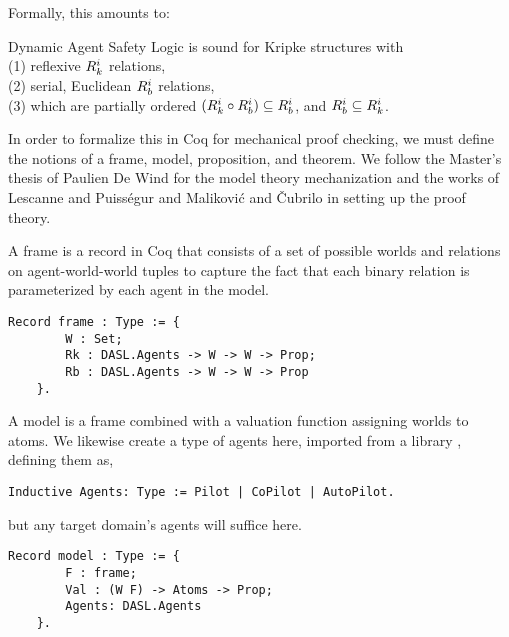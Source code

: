 Formally, this amounts to:

\begin{theorem}[Soundness]
	Dynamic Agent Safety Logic is sound for Kripke structures with\\ (1) reflexive $R_{k}^i$ relations,\\ (2) serial, Euclidean $R_{b}^i$ relations, \\(3) which are partially ordered $(R_{k}^i \circ R_{b}^i) \subseteq R_{b}^i$, and $R_{b}^i \subseteq R_{k}^i$.
\end{theorem}

In order to formalize this in Coq for mechanical proof checking, we must define the notions of a frame, model, proposition, and theorem. We follow the Master's thesis of Paulien De Wind \cite{dewind} for the model theory mechanization and the works of Lescanne and Puiss\'egur \cite{lescanne, puislescanne} and Malikovi\'c and \v Cubrilo \cite{delcoq1, delcoq2} in setting up the proof theory.

A frame is a record in Coq that consists of a set of possible worlds and relations on agent-world-world tuples to capture the fact that each binary relation is parameterized by each agent in the model.

\begin{tcolorbox}
	\begin{lstlisting}[language=Coq]
	Record frame : Type := {
		W : Set;
		Rk : DASL.Agents -> W -> W -> Prop;
		Rb : DASL.Agents -> W -> W -> Prop
	}.
	\end{lstlisting}	
	
\end{tcolorbox}

A model is a frame combined with a valuation function assigning worlds to atoms. We likewise create a type of agents here, imported from a library \DASL, defining them as,

\begin{tcolorbox}
	\begin{lstlisting}[language=Coq]
	Inductive Agents: Type := Pilot | CoPilot | AutoPilot.
	\end{lstlisting}	
	
\end{tcolorbox}
 
 but any target domain's agents will suffice here.

\begin{tcolorbox}
	\begin{lstlisting}[language=Coq]
	Record model : Type := {
		F : frame;
		Val : (W F) -> Atoms -> Prop;
		Agents: DASL.Agents
	}.
	\end{lstlisting}	
	
\end{tcolorbox}


